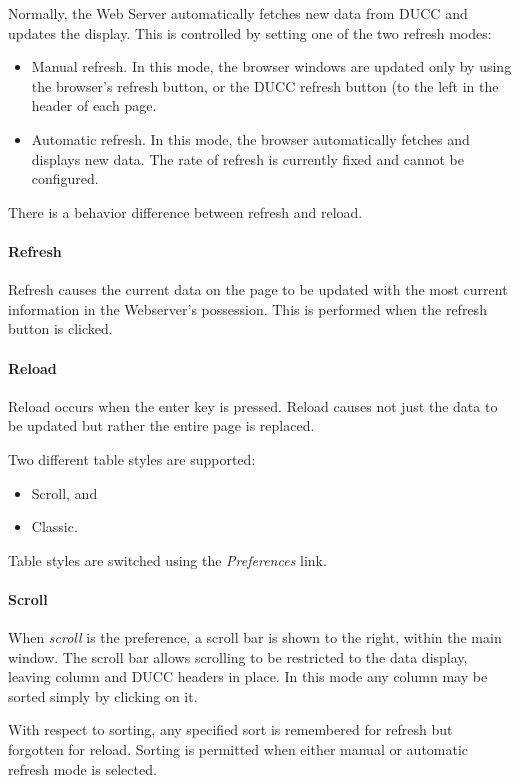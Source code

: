     Normally, the Web Server automatically fetches new data from DUCC and updates the display.
    This is controlled by setting one of the two refresh modes:
    \begin{itemize}
      \item Manual refresh.  In this mode, the browser windows are updated only by using the
        browser's refresh button, or the DUCC refresh button (to the left in the header of
        each page.
      \item Automatic refresh. In this mode, the browser automatically fetches and displays
        new data.  The rate of refresh is currently fixed and cannot be configured.
    \end{itemize}
    
    There is a behavior difference between refresh and reload.
    \paragraph{Refresh}
    Refresh causes the current data on the page to be updated with the most
    current information in the Webserver's possession.  This is performed
    when the refresh button is clicked.
    \paragraph{Reload}
    Reload occurs when the enter key is pressed.  Reload causes not just the
    data to be updated but rather the entire page is replaced.
    
    Two different table styles are supported:
    \begin{itemize}
      \item Scroll, and
      \item Classic.
    \end{itemize}
    Table styles are switched using the {\em Preferences} link.

    \paragraph{Scroll}  When {\em scroll} is the preference, a scroll bar is
    shown to the right, within the main window.  The scroll bar allows scrolling to be restricted to the data
    display, leaving column and DUCC headers in place.  In this mode any column may be sorted
    simply by clicking on it.
    
    With respect to sorting, any specified sort is remembered for refresh
    but forgotten for reload.  Sorting is permitted when either manual
    or automatic refresh mode is selected.
    
